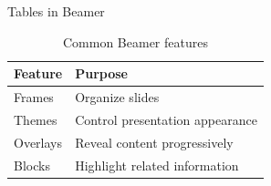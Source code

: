 \documentclass[aspectratio=169,11pt]{beamer}
\begin{document}
\begin{frame}{Tables in Beamer}

    \begin{table}

        \centering

        \begin{tabular}{ll}

            \toprule

            Feature & Purpose \\

            \midrule

            Frames & Organize slides \\

            Themes & Control presentation appearance \\

            Overlays & Reveal content progressively \\

            Blocks & Highlight related information \\

            \bottomrule

        \end{tabular}

        \caption{Common Beamer features}

    \end{table}

\end{frame}
\end{document}
